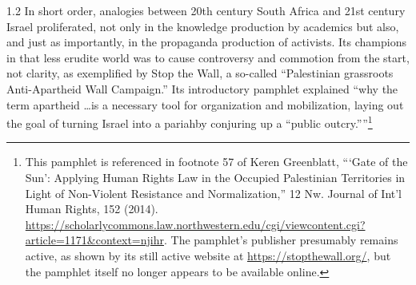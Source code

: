 \documentclass[../unravbook.tex]{subfiles}
\begin{document}
\begin{spacing}{1.2}
In short order, analogies between 20th century South Africa and 21st century Israel proliferated, not only in the knowledge production by academics but also, and just as importantly, in the propaganda production of activists. Its champions in that less erudite world was to cause controversy and commotion from the start, not clarity, as exemplified by Stop the Wall, a so-called \enquote{Palestinian grassroots Anti-Apartheid Wall Campaign.} Its introductory pamphlet explained \enquote{why the term apartheid \dots is a necessary tool for organization and mobilization, laying out the goal of turning Israel into a pariahby conjuring up a ``public outcry.''}\footnote{This pamphlet is referenced in footnote 57 of Keren Greenblatt, \enquote{\enquote*{Gate of the Sun}: Applying Human Rights Law in the Occupied Palestinian Territories in Light of Non-Violent Resistance and Normalization,} 12 Nw. Journal of Int'l Human Rights, 152 (2014). \url{https://scholarlycommons.law.northwestern.edu/cgi/viewcontent.cgi?article=1171\&context=njihr}. The pamphlet's publisher presumably remains active, as shown by its still active website at \url{https://stopthewall.org/}, but the pamphlet itself no longer appears to be available online.} 


\end{spacing}
\end{document}

